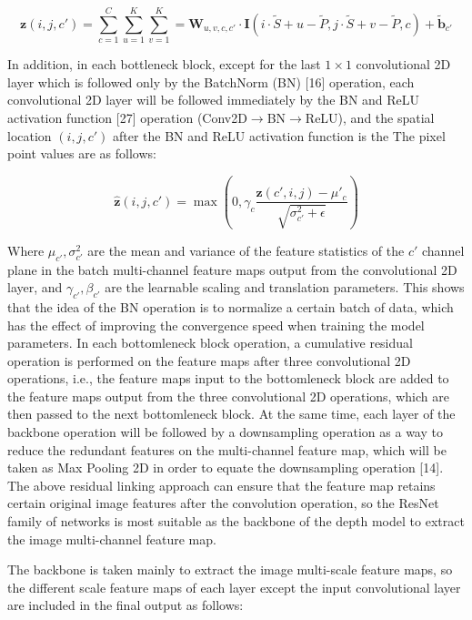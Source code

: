 \begin{equation}
\label{eq1}
  \boldsymbol{z}(i, j, c') = \sum^C_{c=1} \sum^K_{u=1} \sum^K_{v=1} = \mathbf{W}_{u, v, c, c'} \cdot \mathbf{I}(i\cdot \tilde{S}+u-\tilde{P}, j\cdot \tilde{S}+v - \tilde{P}, c) + \tilde{\mathbf{b}}_{c'}
\end{equation}

In addition, in each bottleneck block, except for the last $1\times 1$ convolutional 2D layer which is followed only by the BatchNorm (BN) [16] operation, each convolutional 2D layer will be followed immediately by the BN and ReLU activation function [27] operation (Conv2D$\to$BN$\to$ReLU), and the spatial location $(i,j,c')$ after the BN and ReLU activation function is the The pixel point values are as follows:

\begin{equation}
\label{eq2}
  \hat{\boldsymbol{z}}(i, j, c') = \max \left( 0, \gamma_c \frac{\boldsymbol{z}(c', i, j) - \mu'_c}{\sqrt{\sigma^2_{c'}+\epsilon}} \right)
\end{equation}

Where $\mu_{c'},\sigma_{c'}^2$ are the mean and variance of the feature statistics of the $c'$ channel plane in the batch multi-channel feature maps output from the convolutional 2D layer, and $\gamma_{c'},\beta_{c'}$ are the learnable scaling and translation parameters. This shows that the idea of the BN operation is to normalize a certain batch of data, which has the effect of improving the convergence speed when training the model parameters. In each bottomleneck block operation, a cumulative residual operation is performed on the feature maps after three convolutional 2D operations, i.e., the feature maps input to the bottomleneck block are added to the feature maps output from the three convolutional 2D operations, which are then passed to the next bottomleneck block. At the same time, each layer of the backbone operation will be followed by a downsampling operation as a way to reduce the redundant features on the multi-channel feature map, which will be taken as Max Pooling 2D in order to equate the downsampling operation [14]. The above residual linking approach can ensure that the feature map retains certain original image features after the convolution operation, so the ResNet family of networks is most suitable as the backbone of the depth model to extract the image multi-channel feature map.

The backbone is taken mainly to extract the image multi-scale feature maps, so the different scale feature maps of each layer except the input convolutional layer are included in the final output as follows:

